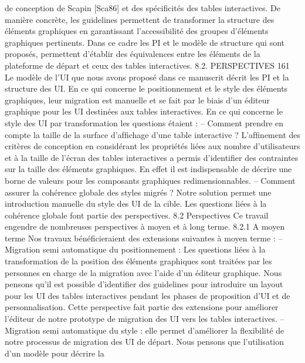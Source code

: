 \documentclass{article}
\begin{document}
de conception de Scapin [Sca86] et des sp\'{e}ciﬁcit\'{e}s des tables interactives.
De mani\`{e}re concr\`{e}te, les guidelines permettent de transformer la structure des \'{e}l\'{e}ments graphiques en garantissant l’accessibilit\'{e} des groupes d’\'{e}l\'{e}ments graphiques pertinents. Dans ce
cadre les PI et le mod\`{e}le de structure qui sont propos\'{e}s, permettent d’\'{e}tablir des \'{e}quivalences
entre les \'{e}l\'{e}ments de la plateforme de d\'{e}part et ceux des tables interactives.
8.2. PERSPECTIVES
161
Le mod\`{e}le de l’UI que nous avons propos\'{e} dans ce manuscrit d\'{e}crit les PI et la structure des
UI. En ce qui concerne le positionnement et le style des \'{e}l\'{e}ments graphiques, leur migration
est manuelle et se fait par le biais d’un \'{e}diteur graphique pour les UI destin\'{e}es aux tables
interactives.
En ce qui concerne le style des UI par transformation les questions \'{e}taient :
– Comment prendre en compte la taille de la surface d’afﬁchage d’une table interactive ?
L’afﬁnement des crit\`{e}res de conception en consid\'{e}rant les propri\'{e}t\'{e}s li\'{e}es aux nombre d’utilisateurs et \`{a} la taille de l’\'{e}cran des tables interactives a permis d’identiﬁer des contraintes sur
la taille des \'{e}l\'{e}ments graphiques. En effet il est indispensable de d\'{e}crire une borne de valeurs
pour les composants graphiques redimensionnables.
– Comment assurer la coh\'{e}rence globale des styles migr\'{e}s ?
Notre solution permet une introduction manuelle du style des UI de la cible. Les questions li\'{e}es
\`{a} la coh\'{e}rence globale font partie des perspectives.
8.2
Perspectives
Ce travail engendre de nombreuses perspectives \`{a} moyen et \`{a} long terme.
8.2.1
A moyen terme
Nos travaux b\'{e}n\'{e}ﬁcieraient des extensions suivantes \`{a} moyen terme :
– Migration semi automatique du positionnement : Les questions li\'{e}es \`{a} la transformation de
la position des \'{e}l\'{e}ments graphiques sont trait\'{e}es par les personnes en charge de la migration
avec l’aide d’un \'{e}diteur graphique. Nous pensons qu’il est possible d’identiﬁer des guidelines
pour introduire un layout pour les UI des tables interactives pendant les phases de proposition
d’UI et de personnalisation. Cette perspective fait partie des extensions pour am\'{e}liorer l’\'{e}diteur
de notre prototype de migration des UI vers les tables interactives.
– Migration semi automatique du style : elle permet d’am\'{e}liorer la ﬂexibilit\'{e} de notre processus
de migration des UI de d\'{e}part. Nous pensons que l’utilisation d’un mod\`{e}le pour d\'{e}crire la
\end{document}
